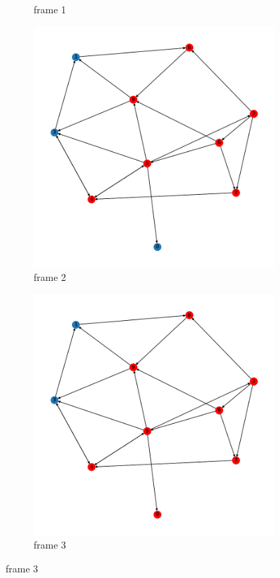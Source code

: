 \documentclass{article}
\begin{document}
\begin{problem}
\begin{figure}[!h]
\begin{subfigure}{0.2\textwidth}
        \caption{frame 1}
    \end{subfigure}
    \begin{subfigure}{0.2\textwidth}
        \includegraphics[width=\textwidth]{./img/P1_3/frame2.png}
        \caption{frame 2}
    \end{subfigure}
    \begin{subfigure}{0.2\textwidth}
        \includegraphics[width=\textwidth]{./img/P1_3/frame3.png}
        \caption{frame 3}
    \end{subfigure}


\end{figure}
\end{problem}
\end{document}
